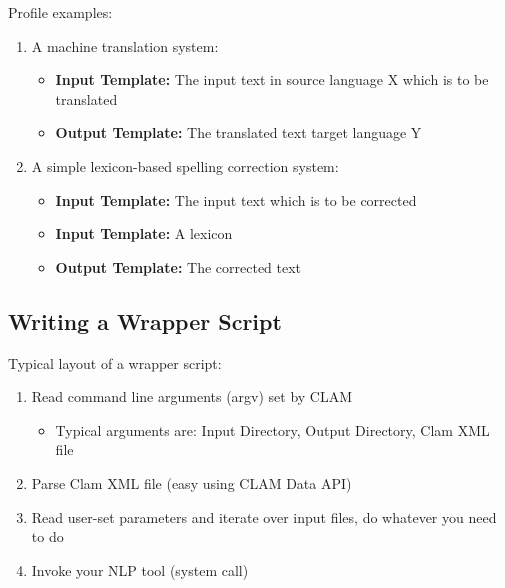 \documentclass[compress]{beamer}
\begin{document}
\begin{frame}
    \begin{example}
        Profile examples: 
        
        \begin{enumerate}
            \item A machine translation system:
            \begin{itemize}
                \item \textbf{Input Template: } The input text in source language X which is to be translated
                \item \textbf{Output Template: } The translated text target language Y
            \end{itemize}    
            \item A simple lexicon-based spelling correction system:
            \begin{itemize}
                \item \textbf{Input Template: } The input text which is to be corrected
                \item \textbf{Input Template: } A lexicon
                \item \textbf{Output Template: } The corrected text
            \end{itemize}    
        \end{enumerate}
        
    \end{example}
\end{frame}

\subsection{Writing a Wrapper Script}

\begin{frame}
    \begin{block}
        Typical layout of a wrapper script:
        \begin{enumerate}
            \item Read command line arguments (argv) set by CLAM
            \begin{itemize}
                \item Typical arguments are: Input Directory, Output Directory, Clam XML file            
            \end{itemize}
            \item Parse Clam XML file (easy using CLAM Data API)
            \item Read user-set parameters and iterate over input files, do whatever you need to do
            \item Invoke your NLP tool (system call)                
        \end{enumerate}
    \end{block}
\end{frame}        
\end{document}
